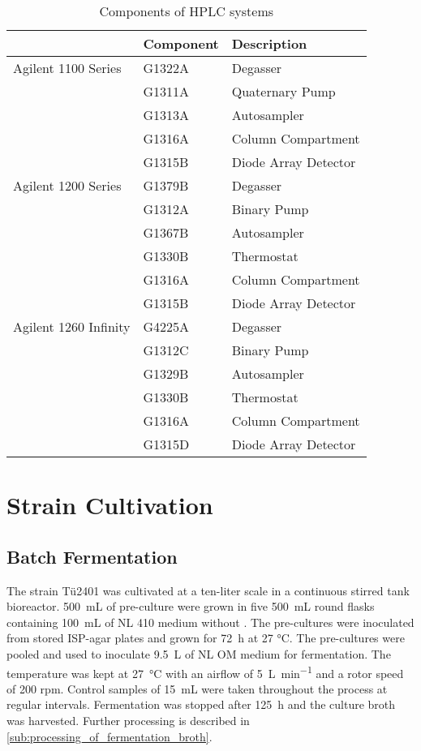 \begin{table}[H]
	\caption{Components of HPLC systems}
	\label{tab:HPLCtab}
	\centering
	\begin{tabularx}{\textwidth}{XXX}
		\toprule
						& \textbf{Component}		& \textbf{Description}	\\
		\midrule
		Agilent 1100 Series		&	G1322A		&	Degasser			\\
								&	G1311A		&	Quaternary Pump		\\
								&	G1313A		&	Autosampler			\\
								&	G1316A		&	Column Compartment	\\
								&	G1315B		&	Diode Array Detector	\\
		\midrule
		Agilent 1200 Series		&	G1379B		&	Degasser			\\
								&	G1312A		&	Binary Pump			\\
								&	G1367B		&	Autosampler			\\
								&	G1330B		&	Thermostat			\\
								&	G1316A		&	Column Compartment	\\
								&	G1315B		&	Diode Array Detector	\\
		\midrule
		Agilent 1260 Infinity	&	G4225A		&	Degasser			\\
								&	G1312C		&	Binary Pump			\\
								&	G1329B		&	Autosampler			\\
								&	G1330B		&	Thermostat			\\
								&	G1316A		&	Column Compartment	\\
								&	G1315D		&	Diode Array Detector	\\
		\bottomrule
	\end{tabularx}
\end{table}


\section{Strain Cultivation} %
\label{sec:strain_cultivation}

	\subsection{Batch Fermentation} %
	\label{sub:fermentation}
	The strain T\"u2401 was cultivated at a ten-liter \cite{Richter2017} scale in a continuous stirred tank bioreactor. \SI{500}{\milli\liter} of pre-culture were grown in five \SI{500}{\milli\liter} round flasks containing \SI{100}{\milli\liter} of NL 410 medium without . The pre-cultures were inoculated from stored ISP-agar plates and grown for \SI{72}{\hour} at 27 \si{\celsius}. The pre-cultures were pooled and used to inoculate \SI{9.5}{\liter} of NL OM medium for fermentation. The temperature was kept at \SI{27}{\celsius} with an airflow of \SI{5}{\liter\per\minute} and a rotor speed of 200 rpm. Control samples of \SI{15}{\milli\liter} were taken throughout the process at regular intervals. Fermentation was stopped after \SI{125}{\hour} and the culture broth was harvested. Further processing is described in \ref{sub:processing_of_fermentation_broth}.
	
